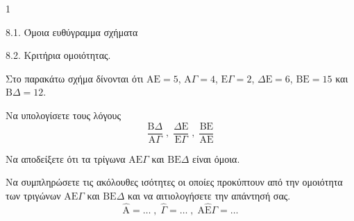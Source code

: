 \begin{ylh}{1}
    \item 8.1. Όμοια ευθύγραμμα σχήματα
    \item 8.2. Κριτήρια ομοιότητας.
\end{ylh}
\begin{figure}
    \centering
\end{figure}
Στο παρακάτω σχήμα δίνονται ότι $\text{AE} = 5$, $\text{A}\Gamma = 4$, $\text{E}\Gamma = 2$, $\Delta\text{E} = 6$, $\text{BE} = 15$ και $\text{B}\Delta = 12$.

\begin{alist}
    \item Να υπολογίσετε τους λόγους
    \[ \frac{\textrm{B}\Delta}{\textrm{A}\Gamma}\;,\; \frac{\Delta\textrm{E}}{\textrm{E}\Gamma}\;,\; \frac{\textrm{B}\textrm{E}}{\textrm{A}\textrm{E}} \]
    \item Να αποδείξετε ότι τα τρίγωνα $\text{AE}\Gamma$ και $\text{BE}\Delta$ είναι όμοια. 
    \item Να συμπληρώσετε τις ακόλουθες ισότητες οι οποίες προκύπτουν από την ομοιότητα των τριγώνων $\text{AE}\Gamma$ και $\text{BE}\Delta$ και να αιτιολογήσετε την απάντησή σας.
    \[ \hat{\text{A}} = \dots\;,\; \hat{\Gamma} = \dots\;,\; \text{A}\hat{\text{E}}\Gamma = \dots \]
\end{alist}